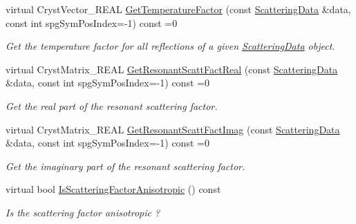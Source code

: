 \begin{DoxyCompactItemize}
\item 
virtual Cryst\+Vector\+\_\+\+R\+E\+AL \mbox{\hyperlink{class_obj_cryst_1_1_scattering_power_a3df723db77380c82ecff5f7050490255}{Get\+Temperature\+Factor}} (const \mbox{\hyperlink{class_obj_cryst_1_1_scattering_data}{Scattering\+Data}} \&data, const int spg\+Sym\+Pos\+Index=-\/1) const =0
\begin{DoxyCompactList}\small\item\em Get the temperature factor for all reflections of a given \mbox{\hyperlink{class_obj_cryst_1_1_scattering_data}{Scattering\+Data}} object. \end{DoxyCompactList}\item 
virtual Cryst\+Matrix\+\_\+\+R\+E\+AL \mbox{\hyperlink{class_obj_cryst_1_1_scattering_power_a42c1302254787d13b9e0f2210315291a}{Get\+Resonant\+Scatt\+Fact\+Real}} (const \mbox{\hyperlink{class_obj_cryst_1_1_scattering_data}{Scattering\+Data}} \&data, const int spg\+Sym\+Pos\+Index=-\/1) const =0
\begin{DoxyCompactList}\small\item\em Get the real part of the resonant scattering factor. \end{DoxyCompactList}\item 
virtual Cryst\+Matrix\+\_\+\+R\+E\+AL \mbox{\hyperlink{class_obj_cryst_1_1_scattering_power_a9bc5d86bf76116f645b43d46f2a9771c}{Get\+Resonant\+Scatt\+Fact\+Imag}} (const \mbox{\hyperlink{class_obj_cryst_1_1_scattering_data}{Scattering\+Data}} \&data, const int spg\+Sym\+Pos\+Index=-\/1) const =0
\begin{DoxyCompactList}\small\item\em Get the imaginary part of the resonant scattering factor. \end{DoxyCompactList}\item 
\mbox{\label{class_obj_cryst_1_1_scattering_power_a58255ba0241bbc8cfb42666d5d757ea3}} 
virtual bool \mbox{\hyperlink{class_obj_cryst_1_1_scattering_power_a58255ba0241bbc8cfb42666d5d757ea3}{Is\+Scattering\+Factor\+Anisotropic}} () const
\begin{DoxyCompactList}\small\item\em Is the scattering factor anisotropic ? \end{DoxyCompactList}\item 
\mbox{\label{class_obj_cryst_1_1_scattering_power_aee21e7bd77b1098948b7612ada357317}} 

\end{DoxyCompactItemize}
